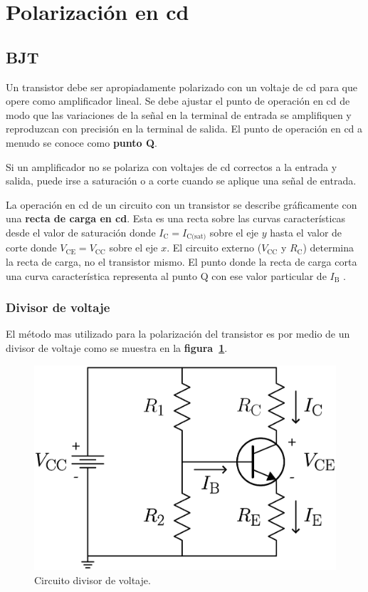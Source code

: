 \section{Polarización en cd}

\subsection{BJT}
Un transistor debe ser apropiadamente polarizado con un voltaje de cd para que
opere como amplificador lineal. Se debe ajustar el punto de operación en cd de
modo que las variaciones de la señal en la terminal de entrada se amplifiquen y
reproduzcan con precisión en la terminal de salida. El punto de operación en cd
a menudo se conoce como \textbf{punto Q}.

Si un amplificador no se polariza con voltajes de cd correctos a la entrada y
salida, puede irse a saturación o a corte cuando se aplique una señal de
entrada.

La operación en cd de un circuito con un transistor se describe gráficamente con
una \textbf{recta de carga en cd}. Esta es una recta sobre las curvas
características desde el valor de saturación donde
$I_{\text{C}} = I_{\text{C(sat)}}$ sobre el eje $y$ hasta el valor de corte
donde $V_{\text{CE}} = V_{\text{CC}}$ sobre el eje $x$. El circuito externo
($V_{\text{CC}}$ y $R_{\text{C}}$) determina la recta de carga, no el transistor
mismo. El punto donde la recta de carga corta una curva característica
representa al punto Q con ese valor particular de $I_{\text{B}}$ \cite{Floyd}.

\subsubsection{Divisor de voltaje}
El método mas utilizado para la polarización del transistor es por medio de un
divisor de voltaje como se muestra en la \textbf{figura~\ref{figura11}}.

\begin{figure}[!ht]
\centering
\includegraphics[scale=0.26]{diagramas/figura11.eps}
\caption{Circuito divisor de voltaje.}
\label{figura11}
\end{figure}

